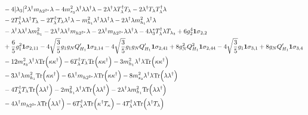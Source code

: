 {\begin{align}
 &-4 |\lambda_3|^2 {\lambda^{\dagger}  m_{{h 2}^{2 *}}  \lambda} -4 m_{s_3}^2 {\lambda^{\dagger}  \lambda  \lambda^{\dagger}  \lambda} -2 {\lambda^{\dagger}  \lambda  T_{\lambda}^{\dagger}  T_{\lambda}} -2 {\lambda^{\dagger}  T_{\lambda}  T_{\lambda}^{\dagger}  \lambda} \nonumber \\ 
 &-2 {T_{\lambda}^{\dagger}  \lambda  \lambda^{\dagger}  T_{\lambda}} -2 {T_{\lambda}^{\dagger}  T_{\lambda}  \lambda^{\dagger}  \lambda} - {m_{h_1}^2  \lambda^{\dagger}  \lambda  \lambda^{\dagger}  \lambda} -2 {\lambda^{\dagger}  \lambda  m_{h_1}^2  \lambda^{\dagger}  \lambda} \nonumber \\ 
 &- {\lambda^{\dagger}  \lambda  \lambda^{\dagger}  \lambda  m_{h_1}^2} -2 {\lambda^{\dagger}  \lambda  \lambda^{\dagger}  m_{{h 2}^{2 *}}  \lambda} -2 {\lambda^{\dagger}  m_{{h 2}^{2 *}}  \lambda  \lambda^{\dagger}  \lambda} -4 \lambda_3^* {T_{\lambda}^{\dagger}  \lambda} T_{\lambda_3} +6 g_{2}^{4} {\bf 1} \sigma_{2,2} \nonumber \\ 
 &+\frac{6}{5} g_{1}^{2} {\bf 1} \sigma_{2,11} -4 \sqrt{\frac{3}{5}} g_1 g_N Q_{H_1}' {\bf 1} \sigma_{2,14} -4 \sqrt{\frac{3}{5}} g_1 g_N Q_{H_1}' {\bf 1} \sigma_{2,41} +8 g_{N}^{2} Q_{H_1}^{2} {\bf 1} \sigma_{2,44} -4 \sqrt{\frac{3}{5}} g_1 {\bf 1} \sigma_{3,1} +8 g_N Q_{H_1}' {\bf 1} \sigma_{3,4} \nonumber \\ 
 &-12 m_{s_3}^2 {\lambda^{\dagger}  \lambda} \mbox{Tr}\Big({\kappa  \kappa^{\dagger}}\Big) -6 {T_{\lambda}^{\dagger}  T_{\lambda}} \mbox{Tr}\Big({\kappa  \kappa^{\dagger}}\Big) -3 {m_{h_1}^2  \lambda^{\dagger}  \lambda} \mbox{Tr}\Big({\kappa  \kappa^{\dagger}}\Big) \nonumber \\ 
 &-3 {\lambda^{\dagger}  \lambda  m_{h_1}^2} \mbox{Tr}\Big({\kappa  \kappa^{\dagger}}\Big) -6 {\lambda^{\dagger}  m_{{h 2}^{2 *}}  \lambda} \mbox{Tr}\Big({\kappa  \kappa^{\dagger}}\Big) -8 m_{s_3}^2 {\lambda^{\dagger}  \lambda} \mbox{Tr}\Big({\lambda  \lambda^{\dagger}}\Big) \nonumber \\ 
 &-4 {T_{\lambda}^{\dagger}  T_{\lambda}} \mbox{Tr}\Big({\lambda  \lambda^{\dagger}}\Big) -2 {m_{h_1}^2  \lambda^{\dagger}  \lambda} \mbox{Tr}\Big({\lambda  \lambda^{\dagger}}\Big) -2 {\lambda^{\dagger}  \lambda  m_{h_1}^2} \mbox{Tr}\Big({\lambda  \lambda^{\dagger}}\Big) \nonumber \\ 
 &-4 {\lambda^{\dagger}  m_{{h 2}^{2 *}}  \lambda} \mbox{Tr}\Big({\lambda  \lambda^{\dagger}}\Big) -6 {T_{\lambda}^{\dagger}  \lambda} \mbox{Tr}\Big({\kappa^{\dagger}  T_{\kappa}}\Big) -4 {T_{\lambda}^{\dagger}  \lambda} \mbox{Tr}\Big({\lambda^{\dagger}  T_{\lambda}}\Big) \nonumber \\ 

\end{align}}
